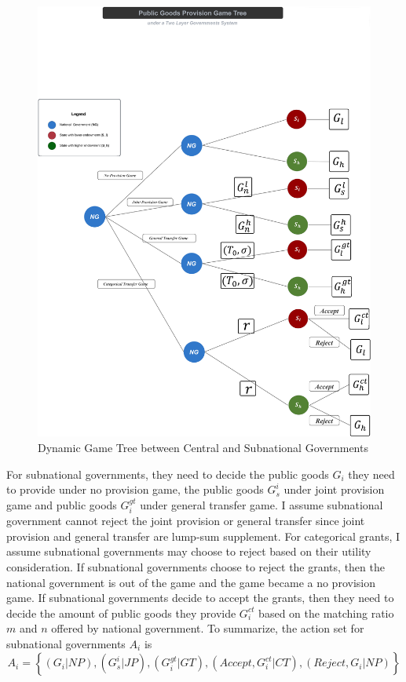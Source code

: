 \begin{itemize}
\begin{landscape}
  \begin{figure}[H]
    \centering
    \includegraphics[scale=0.041]{Chapter-2/Figures/tree.jpg}
    \caption[Dynamic Game Tree of 3 players]{Dynamic Game Tree between Central and Subnational Governments
      \texttt{} }
    \label{dynamicgamenoutility}
  \end{figure}
\end{landscape}

\newpage

For subnational governments, they need to decide the public goods $G_i$ they need to provide under no provision game, the public goods $G_s^i$ under joint provision game and public goods $G_i^{gt}$ under general transfer game. I assume subnational government cannot reject the joint provision or general transfer since joint provision and general transfer are lump-sum supplement. For categorical grants, I assume subnational governments may choose to reject based on their utility consideration. If subnational governments choose to reject the grants, then the national government is out of the game and the game became a no provision game. If subnational governments decide to accept the grants, then they need to decide the amount of public goods they provide $G_i^{ct}$ based on the matching ratio $m$ and $n$ offered by national government. To summarize, the action set for subnational governments $A_i$ is $$A_i=\left\{\left(G_i|NP\right),\left(G_s^i |J P \right),\left(G_i^{gt}|G T \right),\left(Accept,G_i^{ct}|C T\right), (Reject, G_i|NP)\right\} $$


\end{itemize}
